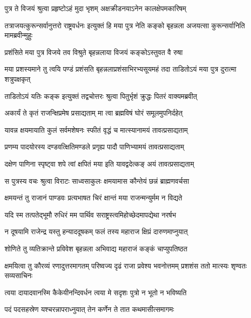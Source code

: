 \twolineshloka
{पुत्र ते विजयं श्रुत्वा प्रहृष्टोऽहं मुदा भृशम्}
{अक्षक्रीडनयाऽनेन कालक्षेपमकारिषम्}


\threelineshloka
{तत्राजयत्कुरून्सर्वानुत्तरो राष्ट्रवर्धनः}
{इत्युक्तं हि मया पुत्र नेति कङ्को बृहन्नला}
{अजयत्सा कुरून्सर्वानिति मामब्रवीन्मुहुः}


\twolineshloka
{प्रशंसिते मया पुत्र विजये तव विश्रुते}
{बृहन्नलाया विजयं कङ्कोऽस्तुवत वै रुषा}


\threelineshloka
{मया प्रशस्यमाने तु त्वयि पण्डं प्रशंसति}
{बृहन्नलाप्रशंसाभिरभ्यसूयमहं तदा}
{ताडितोऽयं मया पुत्र दुरात्मा शत्रुपक्षकृत्}


\twolineshloka
{ताडितोऽयं यतिः कङ्क इत्युक्तं तद्वचोत्तरः}
{श्रुत्वा पितुर्भृशं क्रुद्धः पितरं वाक्यमब्रवीत्}


\twolineshloka
{अकार्यं ते कृतं राजन्क्षिप्रमेष प्रसाद्यताम्}
{मा त्वा ब्रह्मविषं घोरं समूलमुपनिर्दहेत्}


\twolineshloka
{यावन्न क्षयमायाति कुलं सर्वमशेषनः}
{स्फीतं वृद्धं च मात्स्यानामयं तावत्प्रसाद्यताम्}


\twolineshloka
{प्रणम्य पादयोरस्य दण्डवत्क्षितिमण्डले}
{प्रगृह्य पादौ पाणिभ्यामयं तावत्प्रसाद्यताम्}


\twolineshloka
{दक्षेण पाणिना स्पृष्ट्वा शपे त्वां क्षपितं मया}
{इति यावद्वदेत्कङ् अयं तावत्प्रसाद्यताम्}


\twolineshloka
{स पुत्रस्य वचः श्रुत्वा विराटः साध्वसाकुलः}
{क्षमयामास कौन्तेयं छन्नं ब्राह्मणवर्चसा}


\twolineshloka
{क्षमयन्तं तु राजानं पाण्डवः प्रत्यभाषत}
{चिरं क्षान्तं मया राजन्मन्युर्मम न विद्यते}


\twolineshloka
{यदि स्म तत्पतेद्भूमौ रुधिरं मम पार्थिव}
{सराष्ट्रस्त्वमिहोच्छेदमापद्येथा नरर्षभ}


\twolineshloka
{न दूषयामि राजेन्द्र यस्तु हन्याददूषकम्}
{फलं तस्य महाराज क्षिप्रं दारुणमाप्नुयात्}



\twolineshloka
{शोणिते तु व्यतिक्रान्ते प्रविवेश बृहन्नला}
{अभिवाद्य महाराजं कङ्कं चाप्युपतिष्ठत}


\threelineshloka
{क्षमयित्वा तु कौरव्यं रणादुत्तरमागतम्}
{परिष्वज्य दृढं राजा प्रवेश्य भवनोत्तमम्}
{प्रशशंस ततो मात्स्यः शृण्वतः सव्यसाचिनः}




\twolineshloka
{त्वया दायादवानस्मि कैकेयीनन्दिवर्धन}
{त्वया मे सदृशः पुत्रो न भूतो न भविष्यति}


\twolineshloka
{पदं पदसहस्रेण यश्चरन्नापराध्नुयात्}
{तेन कर्णेन ते तात कथमासीत्समागमः}


